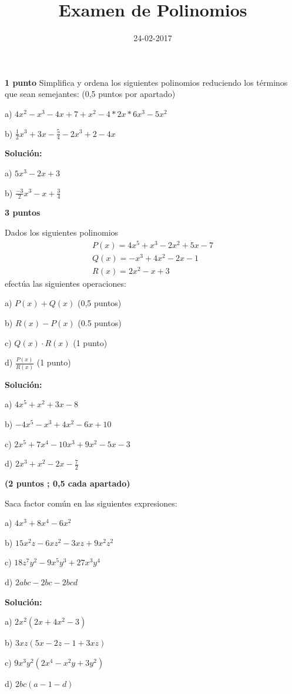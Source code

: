 \documentclass[palatino,noprobframes]{CuartillaSafa}
\title{Examen de Polinomios}
\date{24-02-2017}
\renewcommand{\solution}[1]{\textbf{Solución:}
#1
}
\begin{document}
\cabecera
\pagestyle{fancy}

\begin{problem}\textbf{1 punto}
Simplifica y ordena los siguientes polinomios reduciendo los términos que sean semejantes: (0,5 puntos por apartado)

a) $4x^2-x^3-4x+7+x^2-4*2x*6x^3-5x^2$

b) $\frac{1}{2}x^3+3x-\frac{5}{4}-2x^3+2-4x$

\solution{

a) $5x^3-2x+3$

b) $\frac{-3}{2}x^3-x+\frac{3}{4}$

}
\end{problem}

\begin{problem}\textbf{3 puntos}

Dados los siguientes polinomios
\begin{align*}
P(x) = 4x^5+x^3-2x^2+5x - 7 \\
Q(x) = -x^3+4x^2-2x-1 \\
R(x) = 2x^2-x+3
\end{align*}
efectúa las siguientes operaciones:

a) $P(x) +Q(x)$ (0,5 puntos)

b) $R(x) - P(x)$ (0.5 puntos)

c) $Q(x)\cdot R(x)$ (1 punto)

d) $\frac{P(x)}{R(x)}$ (1 punto)

\solution{

a) $ 4x^5+x^2+3x-8$

b) $-4x^5-x^3+4x^2-6x+10$

c) $2x^5+7x^4-10x^3+9x^2-5x-3$

d) $ 2x^3+x^2-2x-\frac{7}{2}$


}
\end{problem}

\begin{problem}\textbf{(2 puntos ; 0,5 cada apartado)}

Saca factor común en las siguientes expresiones:

a) $4x^3+8x^4-6x^2$

b) $15x^2z-6xz^2-3xz+9x^2z^2$

c) $18z^7y^2-9x^5y^3+27x^3y^4$

d) $2abc-2bc-2bcd$

\solution{

a) $2x^2(2x+4x^2-3)$

b) $3xz(5x-2z-1+3xz)$

c) $9x^3y^2(2x^4-x^2y+3y^2)$

d) $2bc(a-1-d)$

}
\end{problem}
\end{document}
